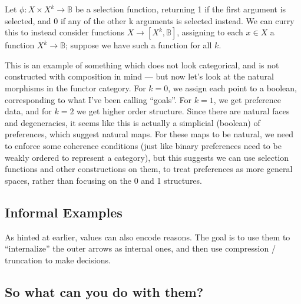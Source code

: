 \documentclass{article}
\begin{document}
	\begin{example}
		Let $\phi : X \times X^k \to \mathbb B$ be a selection function, returning 1 if the first argument is selected, and 0 if any of the other k arguments is selected instead. We can curry this to instead consider functions $X \to [X^k, \mathbb B]$, assigning to each $x \in X$ a function $X^k \to \mathbb B$; suppose we have such a function for all $k$.
		
		This is an example of something which does not look categorical, and is not constructed with composition in mind --- but now let's look at the natural morphisms in the functor category. For $k=0$, we assign each point to a boolean, corresponding to what I've been calling ``goals''. For $k=1$, we get preference data, and for $k = 2$ we get higher order structure. Since there are natural faces and degeneracies, it seems like this is actually a simplicial (boolean) of preferences, which suggest natural maps. For these maps to be natural, we need to enforce some coherence conditions (just like binary preferences need to be weakly ordered to represent a category), but this suggests we can use selection functions and other constructions on them, to treat preferences as more general spaces, rather than focusing on the 0 and 1 structures.
	\end{example}
	
	
	
	
%	

	\subsection{Informal Examples}

	As hinted at earlier, values can also encode reasons. The goal is to use them to ``internalize'' the outer arrows as internal ones, and then use compression / truncation to make decisions.
	\todo{}

	\subsection{So what can you do with them?}
	
\end{document}
